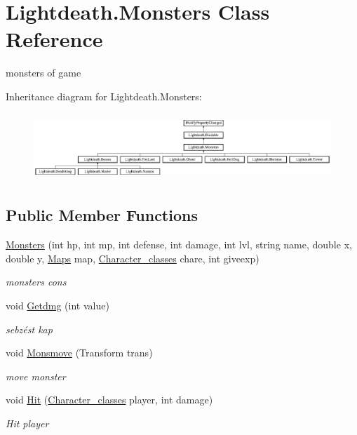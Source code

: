 \hypertarget{class_lightdeath_1_1_monsters}{}\section{Lightdeath.\+Monsters Class Reference}
\label{class_lightdeath_1_1_monsters}


monsters of game  


Inheritance diagram for Lightdeath.\+Monsters\+:\begin{figure}[H]
\begin{center}
\leavevmode
\includegraphics[height=2.564103cm]{class_lightdeath_1_1_monsters}
\end{center}
\end{figure}
\subsection*{Public Member Functions}
\begin{DoxyCompactItemize}
\item 
\hyperlink{class_lightdeath_1_1_monsters_acd2560c5b318a1466901c4637a8565ac}{Monsters} (int hp, int mp, int defense, int damage, int lvl, string name, double x, double y, \hyperlink{class_lightdeath_1_1_maps}{Maps} map, \hyperlink{class_lightdeath_1_1_character__classes}{Character\+\_\+classes} chare, int giveexp)
\begin{DoxyCompactList}\small\item\em monsters cons \end{DoxyCompactList}\item 
void \hyperlink{class_lightdeath_1_1_monsters_a45f12c6e0379b6d5123304cd61d62173}{Getdmg} (int value)
\begin{DoxyCompactList}\small\item\em sebzést kap \end{DoxyCompactList}\item 
void \hyperlink{class_lightdeath_1_1_monsters_a158db6739c1bdfc33fabc6ba7424981a}{Monsmove} (Transform trans)
\begin{DoxyCompactList}\small\item\em move monster \end{DoxyCompactList}\item 
void \hyperlink{class_lightdeath_1_1_monsters_a942b447b0399d3a84db2d94018a89cd7}{Hit} (\hyperlink{class_lightdeath_1_1_character__classes}{Character\+\_\+classes} player, int damage)
\begin{DoxyCompactList}\small\item\em Hit player \end{DoxyCompactList}\end{DoxyCompactItemize}
